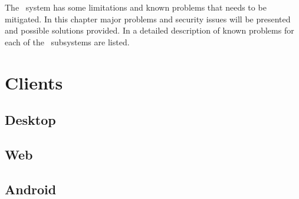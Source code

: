 The \appName\ system has some limitations and known problems that needs to be
mitigated. In this chapter major problems and security issues will be presented
and possible solutions provided. In  a detailed
description of known problems for each of the \appName\ subsystems are listed.

\section{Clients}
\subsection{Desktop}
\FloatBarrier
\subsection{Web}

\FloatBarrier
\subsection{Android}


